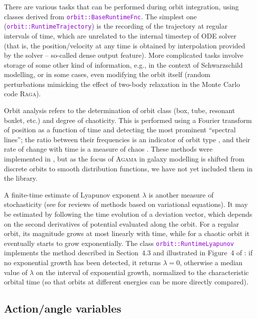 \documentclass[12pt]{article}
\newcommand{\Agama}{\textsc{Agama}\xspace}
\newcommand{\ttt}[1]{\textcolor{darkviolet}{\texttt{#1}}}
\begin{document}
There are various tasks that can be performed during orbit integration, using classes derived from \ttt{orbit::BaseRuntimeFnc}. The simplest one (\ttt{orbit::RuntimeTrajectory}) is the recording of the trajectory at regular intervals of time, which are unrelated to the internal timestep of ODE solver (that is, the  position/\-velocity at any time is obtained by interpolation provided by the solver -- so-called dense output feature). More complicated tasks involve storage of some other kind of information, e.g., in the context of Schwarzschild modelling, or in some cases, even modifying the orbit itself (random perturbations mimicking the effect of two-body relaxation in the Monte Carlo code \textsc{Raga}).

Orbit analysis refers to the determination of orbit class (box, tube, resonant boxlet, etc.) and degree of chaoticity. This is performed using a Fourier transform of position as a function of time and detecting the most prominent ``spectral lines''; the ratio between their frequencies is an indicator of orbit type \cite{BinneySpergel1984, CarpinteroAguilar1998}, and their rate of change with time is a measure of chaos \cite{ValluriMerritt1998}. These methods were implemented in \cite{Vasiliev2013}, but as the focus of \Agama in galaxy modelling is shifted from discrete orbits to smooth distribution functions, we have not yet included them in the library.

A finite-time estimate of Lyapunov exponent $\lambda$ is another measure of stochasticity (see \cite{Carpintero2014, Skokos2010} for reviews of methods based on variational equations). It may be estimated by following the time evolution of a deviation vector, which depends on the second derivatives of potential evaluated along the orbit. For a regular orbit, its magnitude grows at most linearly with time, while for a chaotic orbit it eventually starts to grow exponentially. The class \ttt{orbit::RuntimeLyapunov} implements the method described in Section~4.3 and illustrated in Figure~4 of \cite{Vasiliev2013}: if no exponential growth has been detected, it returns $\lambda=0$, otherwise a median value of $\lambda$ on the interval of exponential growth, normalized to the characteristic orbital time (so that orbits at different energies can be more directly compared).


\subsection{Action/angle variables}  \label{sec:ActionAngle}
\end{document}
